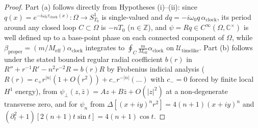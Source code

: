 \documentclass[11pt, a4paper]{article}
\theoremstyle{definition}
\begin{document}
\begin{proof}
Part (a) follows directly from Hypotheses (i)--(ii): since $q(x) = e^{-i\omega_0\tau_{\text{clock}}(x)}: \Omega \to S^1_{T_0}$ is single-valued and $dq = -i\omega_0 q\,\alpha_{\text{clock}}$, its period around any closed loop $C \subset \Omega$ is $-n T_0$ ($n \in \mathbb{Z}$), and $\psi = R q \in C^\infty(\Omega, \mathbb{C}^\times)$ is well defined up to a base-point phase on each connected component of $\Omega$, while $\beta_{\text{proper}} = (m/M_{\text{eff}})\alpha_{\text{clock}}$ integrates to $\oint_C \frac{m}{M_{\text{eff}}}\alpha_{\text{clock}}$ on $\mathcal{U}_{\text{timelike}}$. Part (b) follows under the stated bounded regular radial coefficient $b(r)$ in $R'' + r^{-1}R' - n^2 r^{-2}R = b(r)R$ by Frobenius indicial analysis ($R(r) = c_+ r^{|n|}(1 + O(r^2)) + c_- r^{-|n|}(\dots)$ with $c_- = 0$ forced by finite local $H^1$ energy), from $\psi_\perp(z, \bar{z}) = A z + B\bar{z} + O(|z|^2)$ at a non-degenerate transverse zero, and for $\psi_n$ from $\Delta[(x+iy)^n r^2] = 4(n+1)(x+iy)^n$ and $(\partial_t^2 + 1)[2(n+1)t\sin t] = 4(n+1)\cos t$.


\end{proof}
\end{document}
